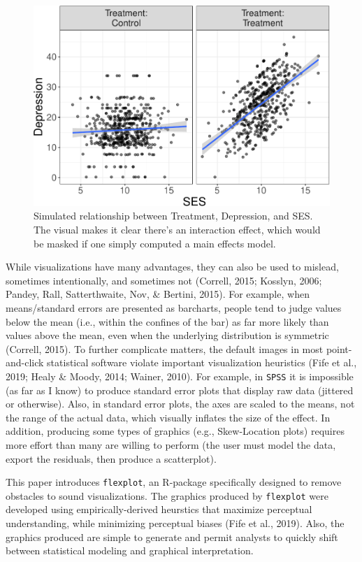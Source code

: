 \documentclass[
  man]{apa6}
\begin{document}
\begin{figure}
\centering
\includegraphics{flexplot_psychmeth_files/figure-latex/ses-1.pdf}
\caption{\label{fig:ses}Simulated relationship between Treatment, Depression, and SES. The visual makes it clear there's an interaction effect, which would be masked if one simply computed a main effects model.}
\end{figure}

While visualizations have many advantages, they can also be used to mislead, sometimes intentionally, and sometimes not (Correll, 2015; Kosslyn, 2006; Pandey, Rall, Satterthwaite, Nov, \& Bertini, 2015). For example, when means/standard errors are presented as barcharts, people tend to judge values below the mean (i.e., within the confines of the bar) as far more likely than values above the mean, even when the underlying distribution is symmetric (Correll, 2015). To further complicate matters, the default images in most point-and-click statistical software violate important visualization heuristics (Fife et al., 2019; Healy \& Moody, 2014; Wainer, 2010). For example, in \texttt{SPSS} it is impossible (as far as I know) to produce standard error plots that display raw data (jittered or otherwise). Also, in standard error plots, the axes are scaled to the means, not the range of the actual data, which visually inflates the size of the effect. In addition, producing some types of graphics (e.g., Skew-Location plots) requires more effort than many are willing to perform (the user must model the data, export the residuals, then produce a scatterplot).

This paper introduces \texttt{flexplot}, an R-package specifically designed to remove obstacles to sound visualizations. The graphics produced by \texttt{flexplot} were developed using empirically-derived heurstics that maximize perceptual understanding, while minimizing perceptual biases (Fife et al., 2019). Also, the graphics produced are simple to generate and permit analysts to quickly shift between statistical modeling and graphical interpretation.
\end{document}
